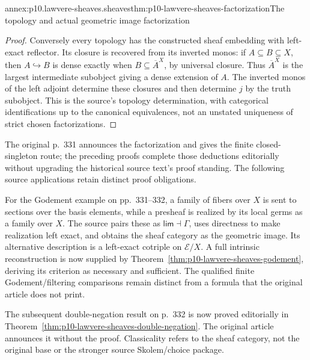 \begin{annexitem}{annex:p10.lawvere-sheaves.sheaves}{thm:p10-lawvere-sheaves-factorization}{The topology and actual geometric image factorization}
\begin{proof}
Conversely every topology has the constructed
sheaf embedding with left-exact reflector.
Its closure is recovered from its inverted
monos: if \(A\subseteq B\subseteq X\), then
\(A\hookrightarrow B\) is dense exactly when
\(B\subseteq\overline A^{X}\), by universal
closure.  Thus \(\overline A^{X}\) is the
largest intermediate subobject giving a dense
extension of \(A\).  The inverted monos of
the left adjoint determine these closures and
then determine \(j\) by the truth subobject.
This is the source's topology determination,
with categorical identifications up to the
canonical equivalences, not an unstated
uniqueness of strict chosen factorizations.
\end{proof}

The original p.~331 announces the factorization and gives
the finite closed-singleton route; the preceding proofs
complete those deductions editorially without upgrading
the historical source text's proof standing.  The following
source applications retain distinct proof obligations.

For the Godement example on pp.~331--332, a family of fibers over
\(X\) is sent to sections over the basis elements, while a
presheaf is realized by its local germs as a family over \(X\).
The source pairs these as \(\mathsf{lim}\dashv\Gamma\),
uses directness to make realization left exact, and obtains the
sheaf category as the geometric image.  Its alternative description
is a left-exact cotriple on \(\mathcal E/X\).  A full intrinsic
reconstruction is now supplied by
Theorem~\ref{thm:p10-lawvere-sheaves-godement}, deriving its
criterion as necessary and sufficient.  The qualified finite
Godement/filtering comparisons remain distinct from a formula
that the original article does not print.

The subsequent double-negation result on p.~332 is now proved
editorially in Theorem~\ref{thm:p10-lawvere-sheaves-double-negation}.
The original article announces it without the proof.  Classicality
refers to the sheaf category, not the original base or the stronger
source Skolem/choice package.
\end{annexitem}

